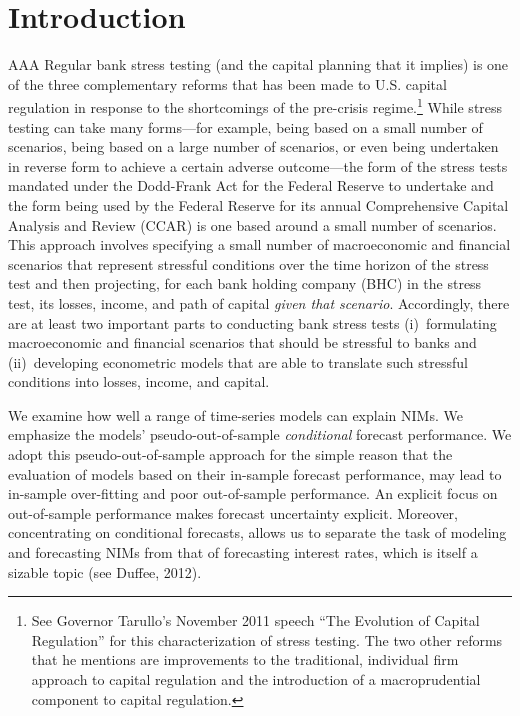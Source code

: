 \documentclass[11pt]{article}
\renewcommand{\baselinestretch}{1.5}
\begin{document}
\renewcommand{\baselinestretch}{1.5} \normalsize
\thispagestyle{empty}

\newpage
\setcounter{page}{1}

\section{Introduction}

\vspace{-0.1in}
AAA Regular bank stress testing (and the capital planning that it implies) is one of the three complementary reforms that has been made to U.S. capital regulation in response to the shortcomings of the pre-crisis regime.\renewcommand{\baselinestretch}{1}\footnote{See Governor Tarullo's November 2011 speech ``The Evolution of Capital Regulation'' for this characterization of stress testing. The two other reforms that he mentions are improvements to the traditional, individual firm approach to capital regulation and the introduction of a macroprudential component to capital regulation.\vspace{0.05in}}\renewcommand{\baselinestretch}{1.5} While stress testing can take many forms---for example, being based on a small number of scenarios, being based on a large number of scenarios, or even being undertaken in reverse form to achieve a certain adverse outcome---the form of the stress tests mandated under the Dodd-Frank Act for the Federal Reserve to undertake and the form being used by the Federal Reserve for its annual Comprehensive Capital Analysis and Review (CCAR) is one based around a small number of scenarios.  This approach involves specifying a small number of macroeconomic and financial scenarios that represent stressful conditions over the time horizon of the stress test and then projecting, for each bank holding company (BHC) in the stress test, its losses, income, and path of capital \textit{given that scenario}. Accordingly, there are at least two important parts to conducting bank stress tests (i)~formulating macroeconomic and financial scenarios that should be stressful to banks and (ii)~developing econometric models that are able to translate such stressful conditions into losses, income, and capital.

We examine how well a range of time-series models can explain NIMs. We emphasize the models' pseudo-out-of-sample \textit{conditional} forecast performance. We adopt this pseudo-out-of-sample approach for the simple reason that the evaluation of models based on their in-sample forecast performance, may lead to in-sample over-fitting and poor out-of-sample performance. An explicit focus on out-of-sample performance makes forecast uncertainty explicit.
Moreover, concentrating on conditional forecasts, allows us to separate the task of modeling and forecasting NIMs from that of forecasting interest rates, which is itself a sizable topic (see Duffee, 2012).
\end{document}

